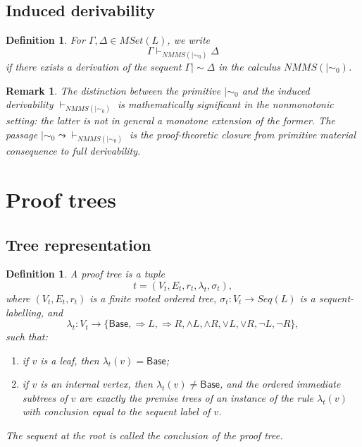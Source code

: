 \documentclass[11pt]{article}
\newtheorem{definition}[theorem]{Definition}
\newtheorem{remark}[theorem]{Remark}
\newcommand{\ms}{\mathrel{\mid\!\sim}}
\newcommand{\mszero}{\mathrel{\mid\!\sim_{0}}}
\newcommand{\MSet}{\mathit{MSet}}
\newcommand{\NMMS}{\mathit{NMMS}}
\newcommand{\Seq}{\mathit{Seq}}
\begin{document}
\medskip



\subsection{Induced derivability}

\begin{definition}
For \(\Gamma,\Delta\in \MSet(L)\), we write
\[
\Gamma \vdash_{\NMMS(\mszero)} \Delta
\]
if there exists a derivation of the sequent \(\Gamma \ms \Delta\) in the
calculus \(\NMMS(\mszero)\).
\end{definition}

\begin{remark}
The distinction between the primitive $\mszero$ and the induced derivability $\vdash_{\NMMS(\mszero)}$ is mathematically significant in the nonmonotonic setting: the latter is not in general a monotone extension of the former. The passage $\mszero \leadsto \vdash_{\NMMS(\mszero)}$ is the proof-theoretic closure from primitive material consequence to full derivability.
\end{remark}

\section{Proof trees}

\subsection{Tree representation}

\begin{definition}
A \emph{proof tree} is a tuple
\[
t=(V_t,E_t,r_t,\lambda_t,\sigma_t),
\]
where \((V_t,E_t,r_t)\) is a finite rooted ordered tree,
\(\sigma_t:V_t\to \Seq(L)\) is a sequent-labelling, and
\[
\lambda_t:V_t\to
\{\mathsf{Base},\Rightarrow L,\Rightarrow R,\wedge L,\wedge R,\vee L,\vee R,\neg L,\neg R\},
\]
such that:
\begin{enumerate}[label=\textup{(\roman*)}]
\item if \(v\) is a leaf, then \(\lambda_t(v)=\mathsf{Base}\);
\item if \(v\) is an internal vertex, then \(\lambda_t(v)\neq \mathsf{Base}\),
and the ordered immediate subtrees of \(v\) are exactly the premise trees of
an instance of the rule \(\lambda_t(v)\) with conclusion equal to the sequent
label of \(v\).
\end{enumerate}
The sequent at the root is called the \emph{conclusion} of the proof tree.
\end{definition}
\end{document}
